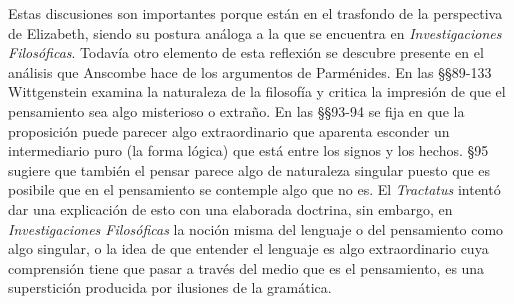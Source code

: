 Estas discusiones son importantes porque están en el trasfondo de la perspectiva de Elizabeth, siendo su postura análoga a la que se encuentra en \emph{Investigaciones Filosóficas}. Todavía otro elemento de esta reflexión se descubre presente en el análisis que Anscombe hace de los argumentos de Parménides. En las \S\S89-133 Wittgenstein examina la naturaleza de la filosofía y critica la impresión de que el pensamiento sea algo misterioso o extraño. En las \S\S93-94 se fija en que la proposición puede parecer algo extraordinario que aparenta esconder un intermediario puro (la forma lógica) que está entre los signos y los hechos. \S95 sugiere que también el pensar parece algo de naturaleza singular puesto que es posibile que en el pensamiento se contemple algo que no es. El \emph{Tractatus} intentó dar una explicación de esto con una elaborada doctrina, sin embargo,
en \emph{Investigaciones Filosóficas} la noción misma del lenguaje o del pensamiento como algo singular, o la idea de que entender el lenguaje es algo extraordinario cuya comprensión tiene que pasar a través del medio que es el pensamiento, es una superstición producida por ilusiones de la gramática.

